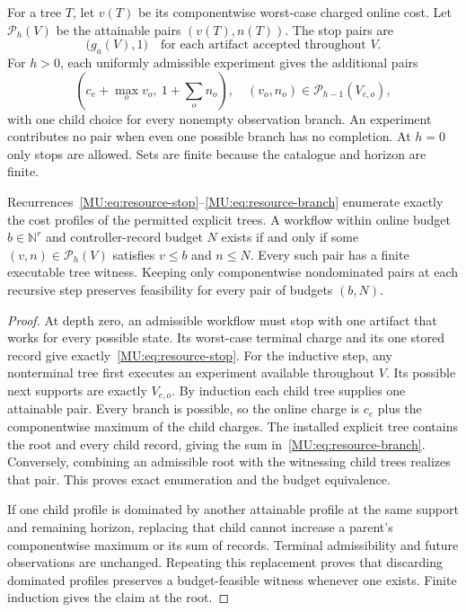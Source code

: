 For a tree $T$, let $v(T)$ be its componentwise worst-case charged online cost. Let $\mathcal P_h(V)$ be the attainable pairs $(v(T),n(T))$. The stop pairs are
\begin{equation}\label{MU:eq:resource-stop}
\bigl(g_a(V),1\bigr)\quad\text{for each artifact accepted throughout }V.
\end{equation}
For $h>0$, each uniformly admissible experiment gives the additional pairs
\begin{equation}\label{MU:eq:resource-branch}
\left(c_e+\max_o v_o,\ 1+\sum_o n_o\right),
\quad (v_o,n_o)\in\mathcal P_{h-1}(V_{e,o}),
\end{equation}
with one child choice for every nonempty observation branch. An experiment contributes no pair when even one possible branch has no completion. At $h=0$ only stops are allowed. Sets are finite because the catalogue and horizon are finite.

\begin{MUtheorem}\label{MU:thm:resource-synthesis}
Recurrences~\eqref{MU:eq:resource-stop}--\eqref{MU:eq:resource-branch} enumerate exactly the cost profiles of the permitted explicit trees. A workflow within online budget $b\in\mathbb N^r$ and controller-record budget $N$ exists if and only if some $(v,n)\in\mathcal P_h(V)$ satisfies $v\leq b$ and $n\leq N$. Every such pair has a finite executable tree witness. Keeping only componentwise nondominated pairs at each recursive step preserves feasibility for every pair of budgets $(b,N)$.
\end{MUtheorem}
\begin{proof}
At depth zero, an admissible workflow must stop with one artifact that works for every possible state. Its worst-case terminal charge and its one stored record give exactly~\eqref{MU:eq:resource-stop}. For the inductive step, any nonterminal tree first executes an experiment available throughout $V$. Its possible next supports are exactly $V_{e,o}$. By induction each child tree supplies one attainable pair. Every branch is possible, so the online charge is $c_e$ plus the componentwise maximum of the child charges. The installed explicit tree contains the root and every child record, giving the sum in~\eqref{MU:eq:resource-branch}. Conversely, combining an admissible root with the witnessing child trees realizes that pair. This proves exact enumeration and the budget equivalence.

If one child profile is dominated by another attainable profile at the same support and remaining horizon, replacing that child cannot increase a parent's componentwise maximum or its sum of records. Terminal admissibility and future observations are unchanged. Repeating this replacement proves that discarding dominated profiles preserves a budget-feasible witness whenever one exists. Finite induction gives the claim at the root.
\end{proof}

